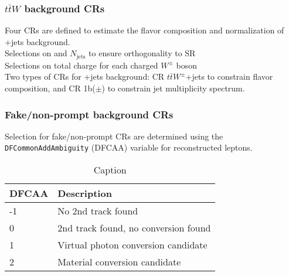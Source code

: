 \documentclass[../thesis.tex]{subfiles}
\begin{document}
\subsubsection*{$t\bar{t}W$ background CRs}
Four CRs are defined to estimate the flavor composition and normalization of \ttW +jets background.\\
Selections on \HT and $N_\mathrm{jets}$ to ensure orthogonality to SR\\
Selections on total charge for each charged $W^\pm$ boson\\
Two types of CRs for \ttW +jets background: CR $t\bar{t}W^\pm$+jets to constrain flavor composition, and CR 1b($\pm$) to constrain jet multiplicity spectrum.

\subsubsection*{Fake/non-prompt background CRs}
Selection for fake/non-prompt CRs are determined using the \verb|DFCommonAddAmbiguity| (DFCAA) variable for reconstructed leptons.

\begin{table}[!ht]
\centering
\begin{tabular}{p{2cm}|l}
\toprule\toprule
DFCAA & Description \\
\midrule
-1			& No 2nd track found \\
0			& 2nd track found, no conversion found \\
1			& Virtual photon conversion candidate \\
2			& Material conversion candidate\\
\bottomrule\bottomrule
\end{tabular}
\caption{\label{tab:ana:DFCAA}Caption}%
\end{table}
\end{document}
